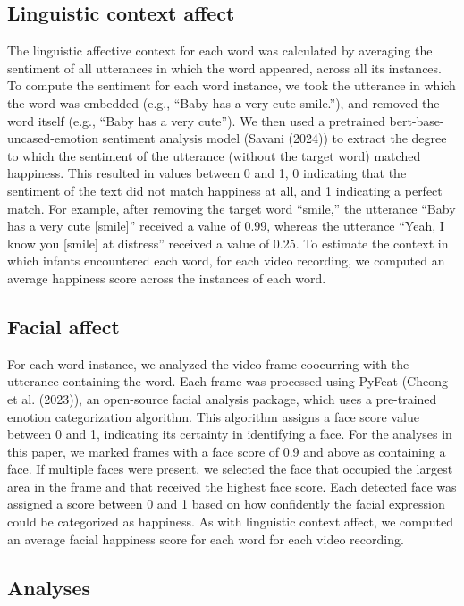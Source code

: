 \documentclass[10pt, letterpaper]{article}
\begin{document}
\subsection{Linguistic context affect}\label{linguistic-context-affect}

The linguistic affective context for each word was calculated by
averaging the sentiment of all utterances in which the word appeared,
across all its instances. To compute the sentiment for each word
instance, we took the utterance in which the word was embedded (e.g.,
``Baby has a very cute smile.''), and removed the word itself (e.g.,
``Baby has a very cute''). We then used a pretrained
bert-base-uncased-emotion sentiment analysis model (Savani (2024)) to
extract the degree to which the sentiment of the utterance (without the
target word) matched happiness. This resulted in values between 0 and 1,
0 indicating that the sentiment of the text did not match happiness at
all, and 1 indicating a perfect match. For example, after removing the
target word ``smile,'' the utterance ``Baby has a very cute
{[}smile{]}'' received a value of 0.99, whereas the utterance ``Yeah, I
know you {[}smile{]} at distress'' received a value of 0.25. To estimate
the context in which infants encountered each word, for each video
recording, we computed an average happiness score across the instances
of each word.

\subsection{Facial affect}\label{facial-affect}

For each word instance, we analyzed the video frame coocurring with the
utterance containing the word. Each frame was processed using PyFeat
(Cheong et al. (2023)), an open-source facial analysis package, which
uses a pre-trained emotion categorization algorithm. This algorithm
assigns a face score value between 0 and 1, indicating its certainty in
identifying a face. For the analyses in this paper, we marked frames
with a face score of 0.9 and above as containing a face. If multiple
faces were present, we selected the face that occupied the largest area
in the frame and that received the highest face score. Each detected
face was assigned a score between 0 and 1 based on how confidently the
facial expression could be categorized as happiness. As with linguistic
context affect, we computed an average facial happiness score for each
word for each video recording.

\subsection{Analyses}\label{analyses}
\end{document}
